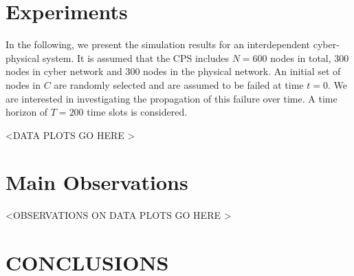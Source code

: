 \documentclass[letterpaper, 10 pt, conference]{ieeeconf}  %
\begin{document}
\section{Experiments} In the following, we present the simulation results for an interdependent cyber-physical system. It is assumed that the CPS includes $N=600$ nodes in total, 300 nodes in cyber network and 300 nodes in the physical network. An initial set of nodes in $C$ are randomly selected and are assumed to be failed at time $t=0$. We are interested in investigating the propagation of this failure over time. A time horizon of $T=200$ time slots is considered.

\textless DATA PLOTS GO HERE \textgreater





\section{Main Observations}
\textless OBSERVATIONS ON DATA PLOTS GO HERE \textgreater





\section{CONCLUSIONS}



\addtolength{\textheight}{-12cm}   %







\end{document}

